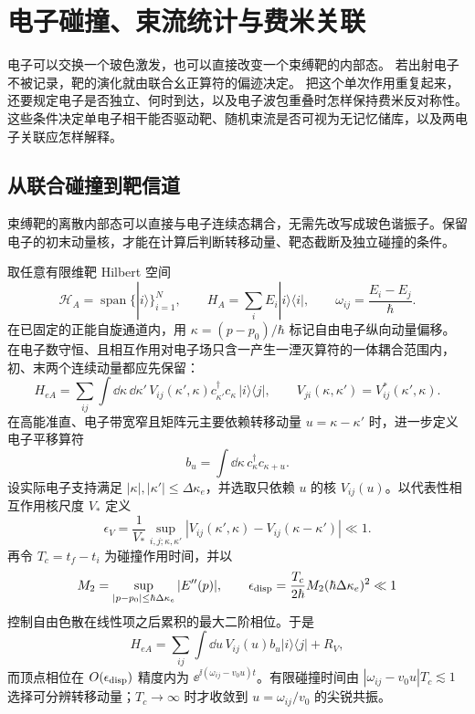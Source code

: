 \chapter{电子碰撞、束流统计与费米关联}\label{chap:electron-collision-dynamics}

电子可以交换一个玻色激发，也可以直接改变一个束缚靶的内部态。
若出射电子不被记录，靶的演化就由联合幺正算符的偏迹决定。
把这个单次作用重复起来，还要规定电子是否独立、何时到达，以及电子波包重叠时怎样保持费米反对称性。
这些条件决定单电子相干能否驱动靶、随机束流是否可视为无记忆储库，以及两电子关联应怎样解释。

\section{从联合碰撞到靶信道}\label{sec:collision-channel-beam-dp19}\label{subsec:single-electron-collision-dp19}

束缚靶的离散内部态可以直接与电子连续态耦合，无需先改写成玻色谐振子。保留电子的初末动量核，才能在计算后判断转移动量、靶态截断及独立碰撞的条件。

取任意有限维靶 Hilbert 空间
\begin{equation*}
\mathcal H_A=\operatorname{span}\{|i\rangle\}_{i=1}^{N},
\qquad H_A=\sum_iE_i|i\rangle\langle i|,
\qquad \omega_{ij}=\frac{E_i-E_j}{\hbar}.
\end{equation*}
在已固定的正能自旋通道内，用 $\kappa=(p-p_0)/\hbar$ 标记自由电子纵向动量偏移。在电子数守恒、且相互作用对电子场只含一产生一湮灭算符的一体耦合范围内，初、末两个连续动量都应先保留：
\begin{equation*}
H_{eA}
=\sum_{ij}\int\dd \kappa\,\dd \kappa'\,
V_{ij}(\kappa',\kappa)c_{\kappa'}^\dagger c_\kappa\,|i\rangle\langle j|,
\qquad
V_{ji}(\kappa,\kappa')=V_{ij}^*(\kappa',\kappa).
\end{equation*}
在高能准直、电子带宽窄且矩阵元主要依赖转移动量 $u=\kappa-\kappa'$ 时，进一步定义电子平移算符
\begin{equation*}
b_u=\int\dd \kappa\,c_\kappa^\dagger c_{\kappa+u}.
\end{equation*}
设实际电子支持满足 $|\kappa|,|\kappa'|\le\Delta\kappa_e$，并选取只依赖 $u$ 的核 $V_{ij}(u)$。以代表性相互作用核尺度 $V_*$ 定义
\begin{equation*}
 \epsilon_V
 =\frac{1}{V_*}
 \sup_{i,j;\kappa,\kappa'}
 |V_{ij}(\kappa',\kappa)-V_{ij}(\kappa-\kappa')|\ll1.
\end{equation*}
再令 $T_c=t_f-t_i$ 为碰撞作用时间，并以
\begin{equation*}
 M_2=\sup_{|p-p_0|\le\hbar\Delta\kappa_e}|E''(p)|,
 \qquad
 \epsilon_{\rm disp}
 =\frac{T_c}{2\hbar}M_2(\hbar\Delta\kappa_e)^2\ll1
\end{equation*}
控制自由色散在线性项之后累积的最大二阶相位。于是
\begin{equation*}
 H_{eA}
 =\sum_{ij}\int\dd u\,V_{ij}(u)b_u|i\rangle\langle j|
 +R_V,
\end{equation*}
而顶点相位在 $O(\epsilon_{\rm disp})$ 精度内为 $\ee^{\ii(\omega_{ij}-v_0u)t}$。有限碰撞时间由 $|\omega_{ij}-v_0u|T_c\lesssim1$ 选择可分辨转移动量；$T_c\to\infty$ 时才收敛到 $u=\omega_{ij}/v_0$ 的尖锐共振。

